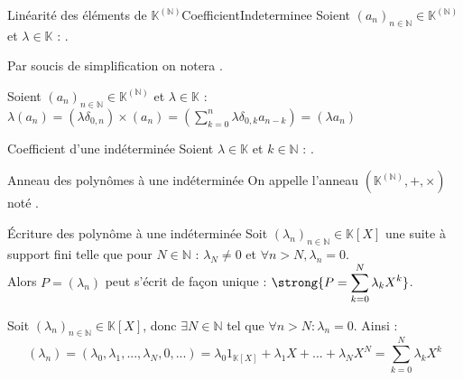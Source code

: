 \documentclass[12pt,a4paper]{report}
\begin{document}
    \begin{proposition}{Linéarité des éléments de $\mathbb{K}^{(\mathbb{N})}$}{CoefficientIndeterminee}
    Soient $(a_n)_{n \in \mathbb{N}} \in \mathbb{K}^{(\mathbb{N})}$ et $\lambda \in \mathbb{K}$ : .
    \end{proposition}
    
    
    \begin{remarque}
    Par soucis de simplification on notera .
    \end{remarque}
    
    \begin{demo}
    Soient $(a_n)_{n \in \mathbb{N}} \in \mathbb{K}^{(\mathbb{N})}$ et $\lambda \in \mathbb{K}$ : $\displaystyle \lambda(a_n) = (\lambda \delta_{0,n}) \times (a_n) = \left( \sum_{k=0}^n \lambda \delta_{0,k} a_{n-k} \right) = (\lambda a_n) $
    \end{demo}
    
    
    
    \begin{corollaire}{Coefficient d'une indéterminée}{}
    Soient $\lambda \in \mathbb{K}$ et $k \in \mathbb{N}$ : .
    \end{corollaire}
    
    
    \begin{definition}{Anneau des polynômes à une indéterminée}{}
    On appelle  l'anneau $\left( \mathbb{K}^{(\mathbb{N})}, +, \times \right)$ noté .
    \end{definition}
    
    
    
    \begin{proposition}{\'Ecriture des polynôme à une indéterminée}{}
    Soit $(\lambda_n)_{n \in \mathbb{N}} \in \mathbb{K}[X]$ une suite à support fini telle que pour $N \in \mathbb{N}$ : $\lambda_N \neq 0$ et $\forall n > N, \lambda_n = 0$.\\
    Alors $P = (\lambda_n)$ peut s'écrit de façon unique : $\displaystyle \strong{P = \sum_{k = 0}^N \lambda_k X^{k}} $.
    \end{proposition}
    
    
    \begin{demo}
    Soit $(\lambda_n)_{n \in \mathbb{N}} \in \mathbb{K}[X]$, donc $\exists N \in \mathbb{N}$ tel que $\forall n > N : \lambda_n = 0$. Ainsi :
    $$ (\lambda_n) = (\lambda_0, \lambda_1, ..., \lambda_N, 0, ...) = \lambda_0 1_{\mathbb{K}[X]} + \lambda_1 X + ... + \lambda_N X^N = \sum_{k = 0}^N \lambda_k X^k $$
    \end{demo}
\end{document}
